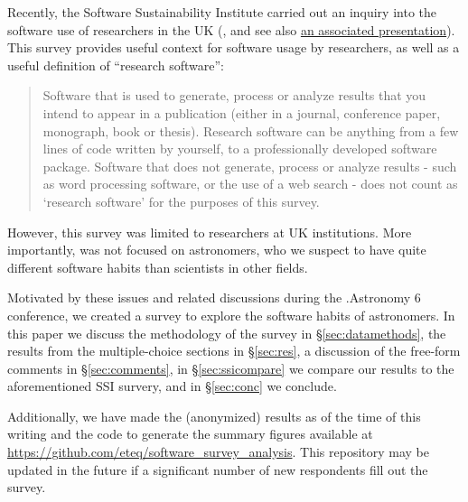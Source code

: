 Recently,  the Software Sustainability Institute carried out an inquiry into the software use of researchers in the UK  (\citet{f824cd98-b953-4c08-96c8-2533188bc4c4}, and see also \href{http://wl.figshare.com/articles/1243288/embed?show_title=1}{an associated presentation}). This survey provides useful context for software usage by researchers, as well as a useful definition of ``research software'':
\begin{quote}
Software that is used to generate, process or analyze results that you intend to appear in a publication (either in a journal, conference paper, monograph, book or thesis). Research software can be anything from a few lines of code written by yourself, to a professionally developed software package. Software that does not generate, process or analyze results - such as word processing software, or the use of a web search - does not count as ‘research software’ for the purposes of this survey.
\end{quote}
However, this survey was limited to researchers at UK institutions.  More importantly, was not focused on astronomers, who we suspect to have quite different software habits than scientists in other fields.

Motivated by these issues and related discussions during the .Astronomy 6 conference, we created a survey to explore the software habits of astronomers.  In this paper we discuss the methodology of the survey in \S \ref{sec:datamethods}, the results from the multiple-choice sections in \S \ref{sec:res}, a discussion of the free-form comments in \S \ref{sec:comments}, in \S \ref{sec:ssicompare} we compare our results to the aforementioned SSI survery, and in \S \ref{sec:conc} we conclude.

Additionally, we have made the (anonymized) results as of the time of this writing and the code to generate the summary figures available at \url{https://github.com/eteq/software_survey_analysis}. This repository may be updated in the future if a significant number of new respondents fill out the survey.
